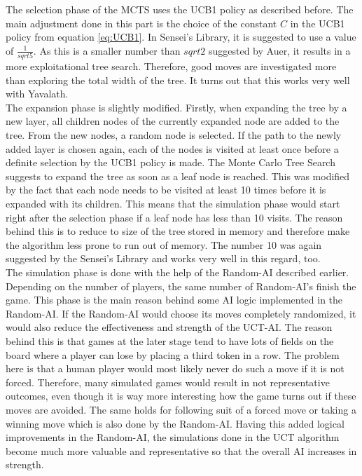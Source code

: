 \documentclass[english]{report}
\begin{document}
The selection phase of the MCTS uses the UCB1 policy as described before. The
main adjustment done in this part is the choice of the constant \(C\) in the
UCB1 policy from equation \ref{eq:UCB1}. In Sensei's Library, it is suggested to
use a value of \(\frac{1}{sqrt{5}}\).\cite{sl} As this is a smaller
number than \(sqrt{2}\) suggested by Auer, it results in a more exploitational
tree search. Therefore, good moves are investigated more than exploring the
total width of the tree. It turns out that this works very well with Yavalath.\\

The expansion phase is slightly modified. Firstly, when expanding the tree by a
new layer, all children nodes of the currently expanded node are added to the
tree. From the new nodes, a random node is selected. If the path to the newly
added layer is chosen again, each of the nodes is visited at least once before a
definite selection by the UCB1 policy is made. The Monte Carlo Tree Search
suggests to expand the tree as soon as a leaf node is reached. This was modified
by the fact that each node needs to be visited at least 10 times before it is
expanded with its children. This means that the simulation phase would start
right after the selection phase if a leaf node has less than 10 visits. The
reason behind this is to reduce to size of the tree stored in memory and
therefore make the algorithm less prone to run out of memory. The number 10 was
again suggested by the Sensei's Library and works very well in this regard, too.\\

The simulation phase is done with the help of the Random-AI described earlier.
Depending on the number of players, the same number of Random-AI's finish the
game. This phase is the main reason behind some AI logic implemented in the
Random-AI. If the Random-AI would choose its moves completely randomized, it
would also reduce the effectiveness and strength of the UCT-AI. The reason
behind this is that games at the later stage tend to have lots of fields on the
board where a player can lose by placing a third token in a row. The problem
here is that a human player would most likely never do such a move if it is not
forced. Therefore, many simulated games would result in not representative
outcomes, even though it is way more interesting how the game turns out if these
moves are avoided. The same holds for following suit of a forced move or taking
a winning move which is also done by the Random-AI. Having this added logical
improvements in the Random-AI, the simulations done in the UCT algorithm become
much more valuable and representative so that the overall AI increases in
strength.\\
\end{document}
